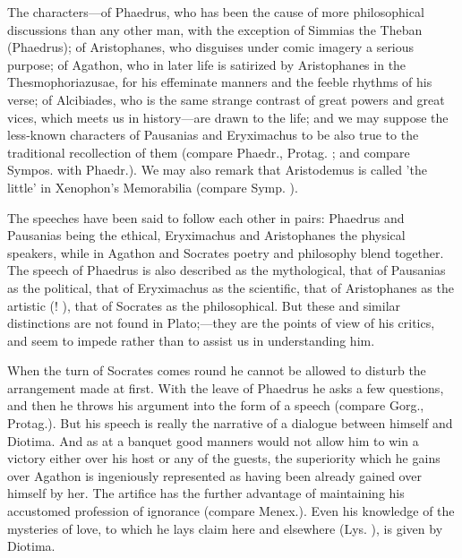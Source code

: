 \documentclass[11pt,letter]{article}
\begin{document}
\par  The characters—of Phaedrus, who has been the cause of more philosophical discussions than any other man, with the exception of Simmias the Theban (Phaedrus); of Aristophanes, who disguises under comic imagery a serious purpose; of Agathon, who in later life is satirized by Aristophanes in the Thesmophoriazusae, for his effeminate manners and the feeble rhythms of his verse; of Alcibiades, who is the same strange contrast of great powers and great vices, which meets us in history—are drawn to the life; and we may suppose the less-known characters of Pausanias and Eryximachus to be also true to the traditional recollection of them (compare Phaedr., Protag. ; and compare Sympos. with Phaedr.). We may also remark that Aristodemus is called 'the little' in Xenophon's Memorabilia (compare Symp. ).

\par  The speeches have been said to follow each other in pairs: Phaedrus and Pausanias being the ethical, Eryximachus and Aristophanes the physical speakers, while in Agathon and Socrates poetry and philosophy blend together. The speech of Phaedrus is also described as the mythological, that of Pausanias as the political, that of Eryximachus as the scientific, that of Aristophanes as the artistic (! ), that of Socrates as the philosophical. But these and similar distinctions are not found in Plato;—they are the points of view of his critics, and seem to impede rather than to assist us in understanding him.

\par  When the turn of Socrates comes round he cannot be allowed to disturb the arrangement made at first. With the leave of Phaedrus he asks a few questions, and then he throws his argument into the form of a speech (compare Gorg., Protag.). But his speech is really the narrative of a dialogue between himself and Diotima. And as at a banquet good manners would not allow him to win a victory either over his host or any of the guests, the superiority which he gains over Agathon is ingeniously represented as having been already gained over himself by her. The artifice has the further advantage of maintaining his accustomed profession of ignorance (compare Menex.). Even his knowledge of the mysteries of love, to which he lays claim here and elsewhere (Lys. ), is given by Diotima.
\end{document}
